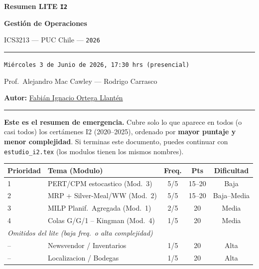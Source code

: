 \documentclass[11pt, a4paper]{article}
\begin{document}
\begin{titlepage}
  \centering
  \vspace*{1.5cm}
  {\Huge\bfseries\color{gopred} Resumen LITE \texttt{I2}\par}
  \vspace{0.3cm}
  {\LARGE\bfseries Gestión de Operaciones\par}
  \vspace{0.2cm}
  {\large ICS3213 --- PUC Chile --- \texttt{2026}\par}
  \vspace{0.8cm}
  \rule{\textwidth}{0.4pt}
  \vspace{0.4cm}

  {\normalsize \texttt{Miércoles 3 de Junio de 2026, 17:30 hrs (presencial)}\par}
  \vspace{0.2cm}
  {\small Prof.\ Alejandro Mac Cawley --- Rodrigo Carrasco\par}
  \vspace{0.2cm}
  {\small\textbf{Autor:} \href{https://cl.linkedin.com/in/fabian-ortega-llanten}{Fabián Ignacio Ortega Llantén}\par}
  \vspace{0.5cm}
  \rule{\textwidth}{0.4pt}
  \vspace{0.5cm}

  \begin{resumentemario}
    \textbf{Este es el resumen de emergencia.} Cubre solo lo que aparece en todos
    (o casi todos) los certámenes I2 (2020--2025), ordenado por \textbf{mayor puntaje
    y menor complejidad}. Si terminas este documento, puedes continuar con
    \texttt{estudio\_i2.tex} (los modulos tienen los mismos nombres).

    \vspace{4pt}
    \begin{tabular}{llccc}
      \toprule
      \textbf{Prioridad} & \textbf{Tema (Modulo)} & \textbf{Freq.} & \textbf{Pts} & \textbf{Dificultad} \\
      \midrule
      1 & PERT/CPM estocastico (Mod.\ 3)  & 5/5 & 15--20 & Baja \\
      2 & MRP + Silver-Meal/WW (Mod.\ 2)  & 5/5 & 15--20 & Baja--Media \\
      3 & MILP Planif.\ Agregada (Mod.\ 1) & 2/5 & 20     & Media \\
      4 & Colas G/G/1 -- Kingman (Mod.\ 4) & 1/5 & 20     & Media \\
      \midrule
      \multicolumn{2}{l}{\textit{Omitidos del lite (baja freq.\ o alta complejidad)}} & & & \\
      -- & Newsvendor / Inventarios         & 1/5 & 20 & Alta \\
      -- & Localizacion / Bodegas           & 1/5 & 20 & Alta \\
      \bottomrule
    \end{tabular}
  \end{resumentemario}


\end{titlepage}
\end{document}
